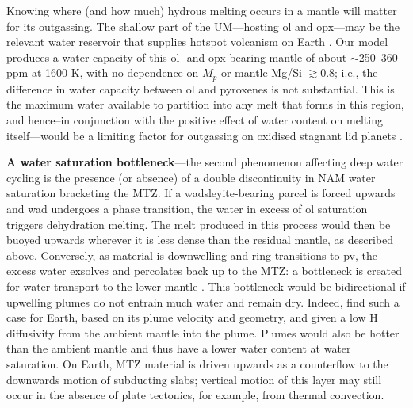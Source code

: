 \documentclass[fleqn,usenatbib]{mnras}
\newcommand{\todo}[1]{\textit{\textcolor{violet}{{#1}}}}
\begin{document}
Knowing where (and how much) hydrous melting occurs in a mantle will matter for its outgassing. The shallow part of the UM---hosting ol and opx---may be the relevant water reservoir that supplies hotspot volcanism on Earth \citep{yang_intraplate_2020}. Our model produces a water capacity of this ol- and opx-bearing mantle of about $\sim$250--360 ppm at 1600 K, with no dependence on $M_p$ or mantle Mg/Si $\gtrsim 0.8$; i.e., the difference in water capacity between ol and pyroxenes is not substantial. This is the maximum water available to partition into any melt that forms in this region, and hence--in conjunction with the positive effect of water content on melting itself---would be a limiting factor for  outgassing on oxidised stagnant lid planets \citep{guimond_low_2021}. 



\medskip

\textbf{A water saturation bottleneck}---the second phenomenon affecting deep water cycling is the presence (or absence) of a double discontinuity in NAM water saturation bracketing the MTZ. If a wadsleyite-bearing parcel is forced upwards and wad undergoes a phase transition, the water in excess of ol saturation triggers dehydration melting. The melt produced in this process would then be buoyed upwards wherever it is less dense than the residual mantle, as described above. Conversely, as material is downwelling and ring transitions to pv, the excess water exsolves and percolates back up to the MTZ: a bottleneck is created for water transport to the lower mantle \citep{bercovici_whole-mantle_2003}. This bottleneck would be bidirectional if upwelling plumes do not entrain much water and remain dry. Indeed, \citet{bercovici_whole-mantle_2003} find such a case for Earth, based on its plume velocity and geometry, and given a low H diffusivity from the ambient mantle into the plume. Plumes would also be hotter than the ambient mantle and thus have a lower water content at water saturation. On Earth, MTZ material is driven upwards as a counterflow to the downwards motion of subducting slabs; vertical motion of this layer may still occur in the absence of plate tectonics, for example, from thermal convection. 
\medskip
\end{document}
